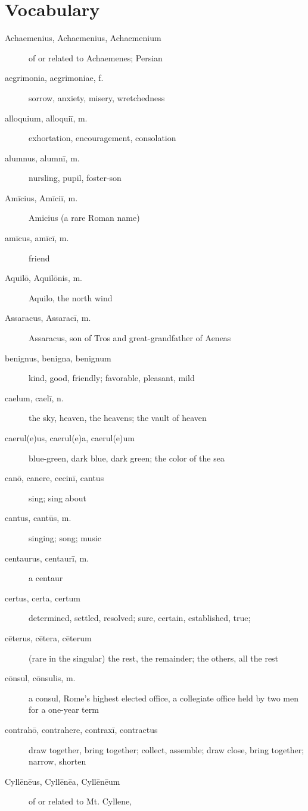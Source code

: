 \chapter*{Vocabulary}

\begin{description}
    \item[Achaemenius, Achaemenius, Achaemenium] of or related to Achaemenes;
        Persian
    \item[aegrimonia, aegrimoniae, f.] sorrow, anxiety, misery, wretchedness
    \item[alloquium, alloquiī, m.] exhortation, encouragement, consolation
    \item[alumnus, alumnī, m.] nursling, pupil, foster-son
    \item[Amīcius, Amīciī, m.] Amicius (a rare Roman name)
    \item[amīcus, amīcī, m.] friend
    \item[Aquilō, Aquilōnis, m.] Aquilo, the north wind
    \item[Assaracus, Assaracī, m.] Assaracus, son of Tros and great-grandfather
        of Aeneas
    \item[benignus, benigna, benignum] kind, good, friendly; favorable,
        pleasant, mild
    \item[caelum, caelī, n.] the sky, heaven, the heavens; the vault of heaven
    \item[caerul(e)us, caerul(e)a, caerul(e)um] blue-green, dark blue, dark
        green; the color of the sea
    \item[canō, canere, cecinī, cantus] sing; sing about
    \item[cantus, cantūs, m.] singing; song; music
    \item[centaurus, centaurī, m.] a centaur
    \item[certus, certa, certum] determined, settled, resolved; sure, certain,
        established, true;
    \item[cēterus, cētera, cēterum] (rare in the singular) the rest, the
        remainder; the others, all the rest
    \item[cōnsul, cōnsulis, m.] a consul, Rome's highest elected office,
        a collegiate office held by two men for a one-year term
    \item[contrahō, contrahere, contraxī, contractus] draw together, bring
        together; collect, assemble; draw close, bring together; narrow,
        shorten
    \item[Cyllēnēus, Cyllēnēa, Cyllēnēum] of or related to Mt. Cyllene,

\end{description}
